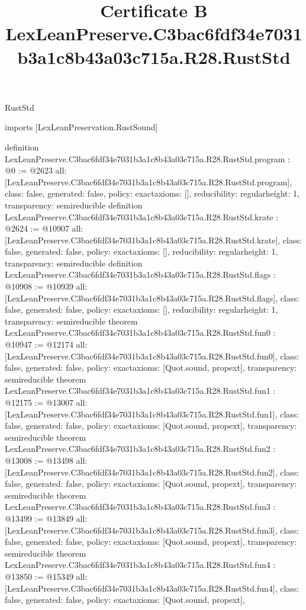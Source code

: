 \begin{lexlean}{RustStd}
\title{Certificate B LexLeanPreserve.C3bac6fdf34e7031b3a1c8b43a03c715a.R28.RustStd}
\begin{coremodule}
imports [LexLeanPreservation.RustSound]

definition LexLeanPreserve.C3bac6fdf34e7031b3a1c8b43a03c715a.R28.RustStd.program : @0 := @2623 {
  all: [LexLeanPreserve.C3bac6fdf34e7031b3a1c8b43a03c715a.R28.RustStd.program],
  class: false,
  generated: false,
  policy: exact{axioms: []},
  reducibility: regular{height: 1},
  transparency: semireducible
}
definition LexLeanPreserve.C3bac6fdf34e7031b3a1c8b43a03c715a.R28.RustStd.krate : @2624 := @10907 {
  all: [LexLeanPreserve.C3bac6fdf34e7031b3a1c8b43a03c715a.R28.RustStd.krate],
  class: false,
  generated: false,
  policy: exact{axioms: []},
  reducibility: regular{height: 1},
  transparency: semireducible
}
definition LexLeanPreserve.C3bac6fdf34e7031b3a1c8b43a03c715a.R28.RustStd.flags : @10908 := @10939 {
  all: [LexLeanPreserve.C3bac6fdf34e7031b3a1c8b43a03c715a.R28.RustStd.flags],
  class: false,
  generated: false,
  policy: exact{axioms: []},
  reducibility: regular{height: 1},
  transparency: semireducible
}
theorem LexLeanPreserve.C3bac6fdf34e7031b3a1c8b43a03c715a.R28.RustStd.fun0 : @10947 := @12174 {
  all: [LexLeanPreserve.C3bac6fdf34e7031b3a1c8b43a03c715a.R28.RustStd.fun0],
  class: false,
  generated: false,
  policy: exact{axioms: [Quot.sound, propext]},
  transparency: semireducible
}
theorem LexLeanPreserve.C3bac6fdf34e7031b3a1c8b43a03c715a.R28.RustStd.fun1 : @12175 := @13007 {
  all: [LexLeanPreserve.C3bac6fdf34e7031b3a1c8b43a03c715a.R28.RustStd.fun1],
  class: false,
  generated: false,
  policy: exact{axioms: [Quot.sound, propext]},
  transparency: semireducible
}
theorem LexLeanPreserve.C3bac6fdf34e7031b3a1c8b43a03c715a.R28.RustStd.fun2 : @13008 := @13498 {
  all: [LexLeanPreserve.C3bac6fdf34e7031b3a1c8b43a03c715a.R28.RustStd.fun2],
  class: false,
  generated: false,
  policy: exact{axioms: [Quot.sound, propext]},
  transparency: semireducible
}
theorem LexLeanPreserve.C3bac6fdf34e7031b3a1c8b43a03c715a.R28.RustStd.fun3 : @13499 := @13849 {
  all: [LexLeanPreserve.C3bac6fdf34e7031b3a1c8b43a03c715a.R28.RustStd.fun3],
  class: false,
  generated: false,
  policy: exact{axioms: [Quot.sound, propext]},
  transparency: semireducible
}
theorem LexLeanPreserve.C3bac6fdf34e7031b3a1c8b43a03c715a.R28.RustStd.fun4 : @13850 := @15349 {
  all: [LexLeanPreserve.C3bac6fdf34e7031b3a1c8b43a03c715a.R28.RustStd.fun4],
  class: false,
  generated: false,
  policy: exact{axioms: [Quot.sound, propext]},
}
\end{coremodule}
\end{lexlean}

